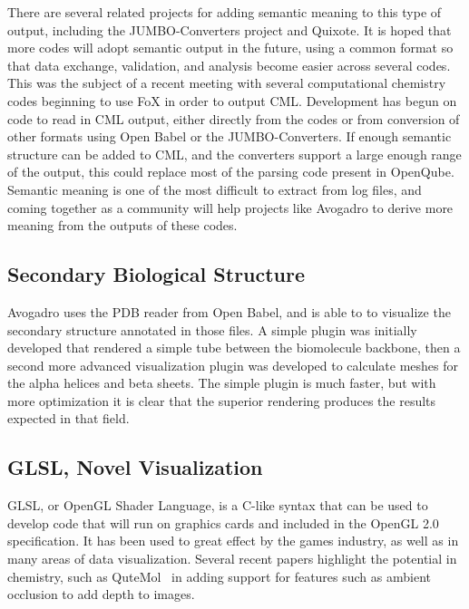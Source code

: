 \documentclass[10pt]{bmc_article}
\newenvironment{bmcformat}{\begin{raggedright}
\baselineskip20pt\sloppy\setboolean{publ}{false}}{\end{raggedright}
\baselineskip20pt\sloppy}
\begin{document}
\begin{bmcformat}
There are several related projects for adding semantic meaning to this type of output,
including the JUMBO-Converters project and Quixote. It is hoped that more codes
will adopt semantic output in the future, using a common format so that data exchange,
validation, and analysis become easier across several codes. This was the subject of
a recent meeting with several computational chemistry codes beginning to use FoX
in order to output CML. Development has begun on code to read in CML output,
either directly from the codes or from conversion of other formats using Open Babel
or the JUMBO-Converters. If enough semantic structure can be added to CML, and the
converters support a large enough range of the output, this could replace most of
the parsing code present in OpenQube. Semantic meaning is one of the most
difficult to extract from log files, and coming together as a community will help
projects like Avogadro to derive more meaning from the outputs of these codes.

\subsection{Secondary Biological Structure}

Avogadro uses the PDB reader from Open Babel, and is able to to visualize the
secondary structure annotated in those files. A simple plugin was initially
developed that rendered a simple tube between the biomolecule backbone, then a
second more advanced visualization plugin was developed to calculate meshes for
the alpha helices and beta sheets. The simple plugin is much faster, but with
more optimization it is clear that the superior rendering produces the results
expected in that field.

\subsection{GLSL, Novel Visualization}

GLSL, or OpenGL Shader Language, is a C-like syntax that can be used to develop
code that will run on graphics cards and included in the OpenGL 2.0
specification. It has been used to great effect by the games industry,
as well as in many areas of data visualization. Several recent papers
highlight the potential in chemistry, such as QuteMol~\cite{QuteMol}
in adding support for features such as ambient occlusion to add depth to images.


\end{bmcformat}
\end{document}

